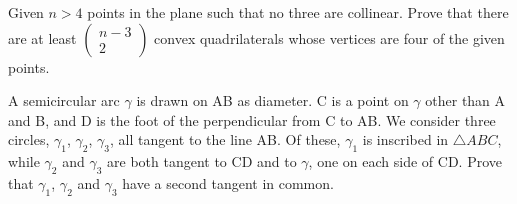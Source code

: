 \item Given $n > 4$ points in the plane such that no three are collinear. Prove that there are at least $\begin{pmatrix} 
n-3 \\ 2 
\end{pmatrix}$ convex quadrilaterals whose vertices are four of the given points.
\item A semicircular arc $\gamma$ is drawn on AB as diameter. C is a point on $\gamma$ other than A and B, and D is the foot of the perpendicular from C to AB. We consider three circles, $\gamma_1$, $\gamma_2$, $\gamma_3$, all tangent to the line AB. Of these, $\gamma_1$ is inscribed in $\triangle{ABC}$, while $\gamma_2$ and $\gamma_3$ are both tangent to CD and to $\gamma$, one on each side of CD. Prove that $\gamma_1$, $\gamma_2$ and $\gamma_3$ have a second tangent in common.



